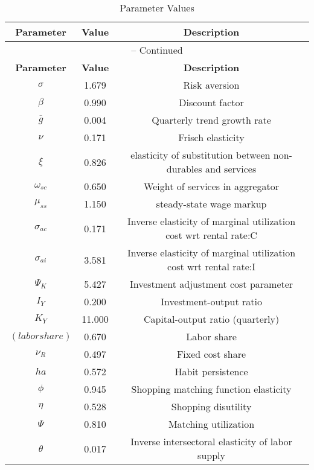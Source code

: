 \begin{center}
\begin{longtable}{ccc}
\caption{Parameter Values}\\%
\toprule%
\multicolumn{1}{c}{\textbf{Parameter}} &
\multicolumn{1}{c}{\textbf{Value}} &
 \multicolumn{1}{c}{\textbf{Description}}\\%
\midrule%
\endfirsthead
\multicolumn{3}{c}{{\tablename} \thetable{} -- Continued}\\%
\midrule%
\multicolumn{1}{c}{\textbf{Parameter}} &
\multicolumn{1}{c}{\textbf{Value}} &
  \multicolumn{1}{c}{\textbf{Description}}\\%
\midrule%
\endhead
${\sigma}$ 	 & 	 1.679 	 & 	 Risk aversion\\
${\beta}$ 	 & 	 0.990 	 & 	 Discount factor\\
${\overline{g}}$ 	 & 	 0.004 	 & 	 Quarterly trend growth rate\\
$\nu$ 	 & 	 0.171 	 & 	 Frisch elasticity\\
$\xi$ 	 & 	 0.826 	 & 	 elasticity of substitution between non-durables and services\\
$\omega_{sc}$ 	 & 	 0.650 	 & 	 Weight of services in aggregator\\
$\mu_{ss}$ 	 & 	 1.150 	 & 	 steady-state wage markup\\
${\sigma_{ac}}$ 	 & 	 0.171 	 & 	 Inverse elasticity of marginal utilization cost wrt rental rate:C\\
${\sigma_{ai}}$ 	 & 	 3.581 	 & 	 Inverse elasticity of marginal utilization cost wrt rental rate:I\\
${\Psi_{K}}$ 	 & 	 5.427 	 & 	 Investment adjustment cost parameter\\
${I_Y}$ 	 & 	 0.200 	 & 	 Investment-output ratio\\
${K_Y}$ 	 & 	 11.000 	 & 	 Capital-output ratio (quarterly)\\
$(labor share)$ 	 & 	 0.670 	 & 	 Labor share\\
${\nu_R}$ 	 & 	 0.497 	 & 	 Fixed cost share\\
${ha}$ 	 & 	 0.572 	 & 	 Habit persistence\\
${\phi}$ 	 & 	 0.945 	 & 	 Shopping matching function elasticity\\
${\eta}$ 	 & 	 0.528 	 & 	 Shopping disutility\\
${\Psi}$ 	 & 	 0.810 	 & 	 Matching utilization\\
${\theta}$ 	 & 	 0.017 	 & 	 Inverse intersectoral elasticity of labor supply\\

\end{longtable}
\end{center}
